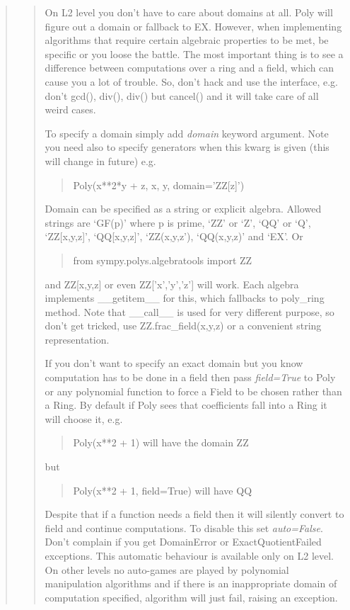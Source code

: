 \begin{quote}
\begin{quote}
On L2 level you don't have to care about domains at all. Poly will
figure out a domain or fallback to EX. However, when implementing
algorithms that require certain algebraic properties to be met, be
specific or you loose the battle. The most important thing is
to see a difference between computations over a ring and a field,
which can cause you a lot of trouble. So, don't hack and use
the interface, e.g. don't gcd(), div(), div() but cancel() and
it will take care of all weird cases.

To specify a domain simply add \emph{domain} keyword argument. Note
you need also to specify generators when this kwarg is given
(this will change in future) e.g.
\begin{quote}

Poly(x**2*y + z, x, y, domain='ZZ{[}z{]}')
\end{quote}

Domain can be specified as a string or explicit algebra. Allowed
strings are `GF(p)' where p is prime, `ZZ' or `Z', `QQ' or `Q',
`ZZ{[}x,y,z{]}', `QQ{[}x,y,z{]}', `ZZ(x,y,z'), `QQ(x,y,z)' and `EX'. Or
\begin{quote}

from sympy.polys.algebratools import ZZ
\end{quote}

and ZZ{[}x,y,z{]} or even ZZ{[}'x','y','z'{]} will work. Each algebra
implements \_\_getitem\_\_ for this, which fallbacks to poly\_ring
method. Note that \_\_call\_\_ is used for very different purpose,
so don't get tricked, use ZZ.frac\_field(x,y,z) or a convenient
string representation.

If you don't want to specify an exact domain but you know
computation has to be done in a field then pass \emph{field=True}
to Poly or any polynomial function to force a Field to be
chosen rather than a Ring. By default if Poly sees that
coefficients fall into a Ring it will choose it, e.g.
\begin{quote}

Poly(x**2 + 1) will have the domain ZZ
\end{quote}

but
\begin{quote}

Poly(x**2 + 1, field=True) will have QQ
\end{quote}

Despite that if a function needs a field then it will silently
convert to field and continue computations. To disable this
set \emph{auto=False}. Don't complain if you get DomainError or
ExactQuotientFailed exceptions. This automatic behaviour is
available only on L2 level. On other levels no auto-games are
played by polynomial manipulation algorithms and if there is
an inappropriate domain of computation specified, algorithm
will just fail, raising an exception.


\end{quote}
\end{quote}
